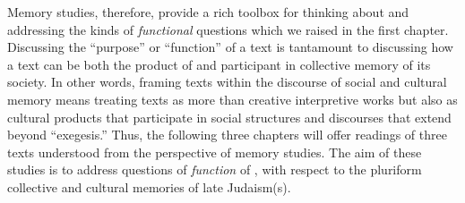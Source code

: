 Memory studies, therefore, provide a rich toolbox for thinking about and addressing the kinds of \emph{functional} questions which we raised in the first chapter. Discussing the ``purpose'' or ``function'' of a text is tantamount to discussing how a text can be both the product of and participant in collective memory of its society. In other words, framing \rwb texts within the discourse of social and cultural memory means treating \rwb texts as more than creative interpretive works but also as cultural products that participate in social structures and discourses that extend beyond ``exegesis.'' Thus, the following three chapters will offer readings of three \rwb texts understood from the perspective of memory studies. The aim of these studies is to address questions of \emph{function} of \rwb, with respect to the pluriform collective and cultural memories of late \secondtemple Judaism(s).